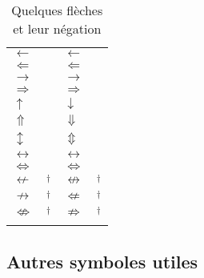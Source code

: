 \begin{table}
  \caption{Quelques flèches et leur négation}
  \label{tab:math:fleches}
  \begin{tabularx}{1.0\linewidth}{lXlX}
    $\gets$                & \cmd{\leftarrow}\quad \cmd{\gets} &
    $\longleftarrow$       & \cmd{\longleftarrow}              \\
    $\Leftarrow$           & \cmd{\Leftarrow}                  &
    $\Longleftarrow$       & \cmd{\Longleftarrow}              \\
    $\to$                  & \cmd{\rightarrow}\quad \cmd{\to}  &
    $\longrightarrow$      & \cmd{\longrightarrow}             \\
    $\Rightarrow$          & \cmd{\Rightarrow}                 &
    $\Longrightarrow$      & \cmd{\Longrightarrow}             \\
    $\uparrow$             & \cmd{\uparrow}                    &
    $\downarrow$           & \cmd{\downarrow}                  \\
    $\Uparrow$             & \cmd{\Uparrow}                    &
    $\Downarrow$           & \cmd{\Downarrow}                  \\
    $\updownarrow$         & \cmd{\updownarrow}                &
    $\Updownarrow$         & \cmd{\Updownarrow}                \\
    $\leftrightarrow$      & \cmd{\leftrightarrow}             &
    $\longleftrightarrow$  & \cmd{\longleftrightarrow}         \\
    $\Leftrightarrow$      & \cmd{\Leftrightarrow}             &
    $\Longleftrightarrow$  & \cmd{\Longleftrightarrow}         \\
    $\nleftarrow$          & \cmd{\nleftarrow}$^\dagger$         &
    $\nleftrightarrow$     & \cmd{\nleftrightarrow}$^\dagger$    \\
    $\nrightarrow$         & \cmd{\nrightarrow}$^\dagger$        &
    $\nLeftarrow$          & \cmd{\nLeftarrow}$^\dagger$         \\
    $\nLeftrightarrow$     & \cmd{\nLeftrightarrow}$^\dagger$    &
    $\nRightarrow$         & \cmd{\nRightarrow}$^\dagger$        \\
    \addlinespace
  \end{tabularx}
\end{table}

\subsection{Autres symboles utiles}
\label{sec:math:symboles:autres}

